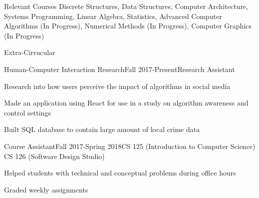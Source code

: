 \documentclass{resume} %
\begin{document}
    \begin{rSection}{Relevant Courses}
Discrete Structures, Data Structures, Computer Architecture, Systems Programming, Linear Algebra, Statistics, Advanced Computer Algorithms (In Progress), Numerical Methods (In Progress), Computer Graphics (In Progress)

    \end{rSection}


    \begin{rSection}{Extra-Cirrucular} \itemsep -3pt
            \begin{rSubsection}{Human-Computer Interaction Research}{Fall 2017-Present}{Research Assistant}{}{}
            \item Research into how users perceive the impact of algorithms in social media
            \item Made an application using React for use in a study on algorithm awareness and control settings
            \item Built SQL database to contain large amount of local crime data
            \end{rSubsection}

            \begin{rSubsection}{Course Assistant}{Fall 2017-Spring 2018}{CS 125 (Introduction to Computer Science) \\ CS 126 (Software Design Studio)}{}{}
            \item Helped students with technical and conceptual problems during office hours
            \item Graded weekly assignments
            \end{rSubsection}

    \end{rSection}

    
\end{document}
